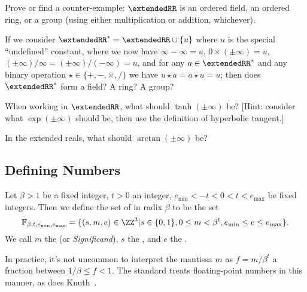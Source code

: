 \begin{xca}
  Prove or find a counter-example: $\extendedRR$ is an ordered field, an
  ordered ring, or a group (using either multiplication or addition, whichever).
\end{xca}


\begin{xca}
  If we consider $\extendedRR^{*}=\extendedRR\cup\{u\}$ where $u$ is the
  special ``undefined'' constant, where we now have $\infty-\infty=u$,
  $0\times(\pm\infty)=u$, $(\pm\infty)/\infty=(\pm\infty)/(-\infty)=u$,
  and for any $a\in\extendedRR^{*}$ and any binary operation
  $\star\in\{+,-,\times,/\}$ we have $u\star a = a\star u = u$;
  then does $\extendedRR^{*}$ form a field? A ring? A group?
\end{xca}


\begin{xca}
  When working in $\extendedRR$, what should $\tanh(\pm\infty)$ be?
  [Hint: consider what $\exp(\pm\infty)$ should be, then use the
    definition of hyperbolic tangent.]
\end{xca}


\begin{xca}
  In the extended reals, what should $\arctan(\pm\infty)$ be?
\end{xca}

\subsection{Defining Numbers}
\begin{defn}
  Let $\beta>1$ be a fixed integer, $t>0$ an integer,
  $e_{\text{min}}<-t<0<t<e_{\text{max}}$ be
  fixed integers. Then we define the set of 
  in radix $\beta$ to be the set
  \begin{equation}
    \mathbb{F}_{\beta,t,e_{\text{min}},e_{\text{max}}} = \{(s,m,e)\in\ZZ^{3}|
    s\in\{0,1\}, 0\leq m<\beta^{t}, e_{\text{min}}\leq e\leq e_{\text{max}}\}.
  \end{equation}
  We call $m$ the  (or \emph{Significand}), $s$ the
  , and $e$ the .
\end{defn}


\begin{danger}
  In practice, it's not uncommon to interpret the mantissa $m$ as
  $f=m/\beta^{t}$ a fraction between $1/\beta\leq f<1$. The 
  standard treats floating-point numbers in this manner, as does
  Knuth~\cite{taocp2}.
\end{danger}


